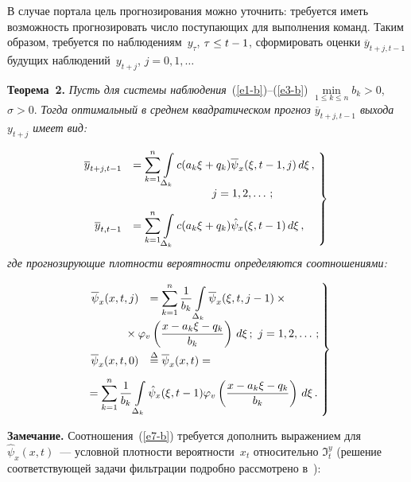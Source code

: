 \begin{multicols}{2}
  В случае портала цель прогнозирования можно уточнить: требуется иметь возможность 
прогнозировать число поступающих для выполнения команд. Таким образом, требуется по 
наблюдениям~$y_\tau$, $\tau\hm\leq t-1$, сформировать оценки $\overline{y}_{t+j,t-1}$ 
будущих наблюдений~$y_{t+j}$, $j=0,1,\ldots$
  
  \smallskip
  
  \noindent
  \textbf{Теорема~2.} \textit{Пусть для сис\-те\-мы наблюдения}~(\ref{e1-b})--(\ref{e3-b}) 
$\min\limits_{1\leq k\leq n} b_k>0$, $\sigma>0$. \textit{Тогда оптимальный в среднем 
квадратическом прогноз $\overline{y}_{t+j,t-1}$ выхода~$y_{t+j}$ имеет вид:}

\noindent
  \begin{equation}
\hspace*{-3mm}  \left.
  \begin{array}{rl}
  \overline{y}_{t+j,t-1}&=\displaystyle \sum\limits_{k=1}^n \int\limits_{\Delta_k} c(a_k \xi 
+q_k)\overline{\psi}_x(\xi, t-1, j)\,d\xi\,,\\[9pt]
&\hspace*{25mm}j=1,2, \ldots\,;\\[9pt]
  \overline{y}_{t,t-1} &= \displaystyle \sum\limits_{k=1}^n \int\limits_{\Delta_k} c(a_k\xi 
+q_k)\hat{\psi}_x (\xi,t-1)\,d\xi\,,
  \end{array}\!
  \right\}
  \label{e6-b}
  \end{equation}
\textit{где прогнозирующие плотности вероятности определяются соотношениями:}

\noindent
\begin{equation}
\left.
\begin{array}{rl}
\overline{\psi}_x(x,t,j)  &= \displaystyle\sum\limits_{k=1}^n \fr{1}{b_k}\int\limits_{\Delta_k} 
\overline{\psi}_x (\xi,t,j-1)\times{}\\[9pt]
&\hspace*{-8mm}{}\times \varphi_v \left( \fr{x-a_k\xi-q_k}{b_k}\right)\,d\xi\,;\ 
j=1,2, \ldots \,;\\[9pt]
\overline{\psi}_x(x,t,0) &\overset{\Delta}{=} \overline{\psi}_x(x,t)={}\\[9pt]
&\hspace*{-20mm}{}= \displaystyle \sum\limits_{k=1}^n \fr{1}{b_k} 
\int\limits_{\Delta_k} \hat{\psi}_x(\xi,t-1)\varphi_v \left( \fr{x-a_k\xi-q_k}{b_k}\right) \,d\xi\,.
\end{array}\!\!
\right\}
\label{e7-b}
\end{equation}
  
  \noindent
  \textbf{Замечание.} Соотношения~(\ref{e7-b}) требуется дополнить выражением для 
$\hat{\psi}_x(x,t)$~--- условной плотности вероятности~$x_t$ относительно $\Im_t^y$ 
(решение соответствующей задачи фильтрации подробно рассмотрено в~\cite{13-b, 14-b}):

\end{multicols}

